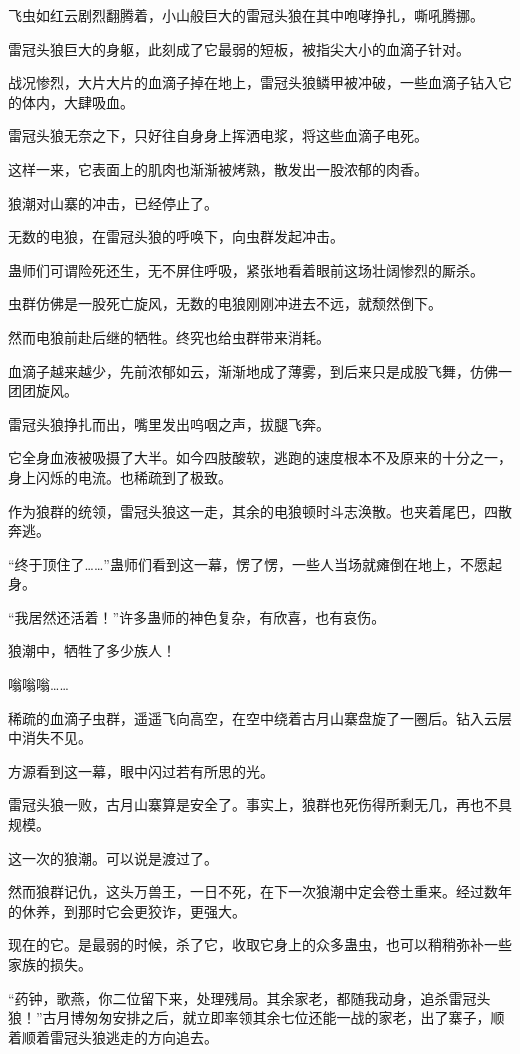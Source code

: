 \begin{this_body}
飞虫如红云剧烈翻腾着，小山般巨大的雷冠头狼在其中咆哮挣扎，嘶吼腾挪。

雷冠头狼巨大的身躯，此刻成了它最弱的短板，被指尖大小的血滴子针对。

战况惨烈，大片大片的血滴子掉在地上，雷冠头狼鳞甲被冲破，一些血滴子钻入它的体内，大肆吸血。

雷冠头狼无奈之下，只好往自身身上挥洒电浆，将这些血滴子电死。

这样一来，它表面上的肌肉也渐渐被烤熟，散发出一股浓郁的肉香。

狼潮对山寨的冲击，已经停止了。

无数的电狼，在雷冠头狼的呼唤下，向虫群发起冲击。

蛊师们可谓险死还生，无不屏住呼吸，紧张地看着眼前这场壮阔惨烈的厮杀。

虫群仿佛是一股死亡旋风，无数的电狼刚刚冲进去不远，就颓然倒下。

然而电狼前赴后继的牺牲。终究也给虫群带来消耗。

血滴子越来越少，先前浓郁如云，渐渐地成了薄雾，到后来只是成股飞舞，仿佛一团团旋风。

雷冠头狼挣扎而出，嘴里发出呜咽之声，拔腿飞奔。

它全身血液被吸摄了大半。如今四肢酸软，逃跑的速度根本不及原来的十分之一，身上闪烁的电流。也稀疏到了极致。

作为狼群的统领，雷冠头狼这一走，其余的电狼顿时斗志涣散。也夹着尾巴，四散奔逃。

“终于顶住了……”蛊师们看到这一幕，愣了愣，一些人当场就瘫倒在地上，不愿起身。

“我居然还活着！”许多蛊师的神色复杂，有欣喜，也有哀伤。

狼潮中，牺牲了多少族人！

嗡嗡嗡……

稀疏的血滴子虫群，遥遥飞向高空，在空中绕着古月山寨盘旋了一圈后。钻入云层中消失不见。

方源看到这一幕，眼中闪过若有所思的光。

雷冠头狼一败，古月山寨算是安全了。事实上，狼群也死伤得所剩无几，再也不具规模。

这一次的狼潮。可以说是渡过了。

然而狼群记仇，这头万兽王，一日不死，在下一次狼潮中定会卷土重来。经过数年的休养，到那时它会更狡诈，更强大。

现在的它。是最弱的时候，杀了它，收取它身上的众多蛊虫，也可以稍稍弥补一些家族的损失。

“药钟，歌燕，你二位留下来，处理残局。其余家老，都随我动身，追杀雷冠头狼！”古月博匆匆安排之后，就立即率领其余七位还能一战的家老，出了寨子，顺着顺着雷冠头狼逃走的方向追去。


\end{this_body}
